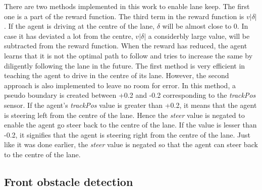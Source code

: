 There are two methods implemented in this work to enable lane keep. The first one is a part of the reward function. The third term in the reward function is $v|\delta|$. If the agent is driving at the centre of the lane, $\delta$ will be almost close to 0. In case it has deviated a lot from the centre, $v|\delta|$ a considerbly large value, will be subtracted from the reward function. When the reward has reduced, the agent learns that it is not the optimal path to follow and tries to increase the same by diligently following the lane in the future. The first method is very efficient in teaching the agent to drive in the centre of its lane. However, the second approach is also implemented to leave no room for error. In this method, a pseudo boundary is created between +0.2 and -0.2 corresponding to the \emph{trackPos} sensor. If the agent's \emph{trackPos} value is greater than +0.2, it means that the agent is steering left from the centre of the lane. Hence the \emph{steer} value is negated to enable the agent go steer back to the centre of the lane. If the value is lesser than -0.2, it signifies that the agent is steering right from the centre of the lane. Just like it was done earlier, the \emph{steer} value is negated so that the agent can steer back to the centre of the lane. 

\subsection{Front obstacle detection}


